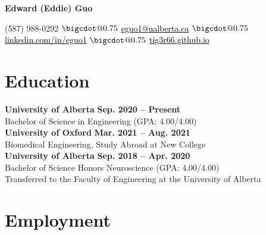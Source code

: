 \documentclass{article}
\makeatletter
\newcommand*\bigcdot{\mathpalette\bigcdot@{0.75}}
\newcommand*\bigcdot@[2]{\mathbin{\vcenter{\hbox{\scalebox{#2}{$\m@th#1\bullet$}}}}}
\makeatother
\begin{document}
\thispagestyle{plain}
\LARGE \textbf{\textcolor{my_colour}{Edward (Eddie) Guo}} \vspace{.25em}

\normalfont \normalsize
(587) 988-0292
    \hspace{.25em} $\bigcdot$ \hspace{.25em}
\href{mailto:eguo1@ualberta.ca}{\textcolor{black}{eguo1@ualberta.ca}}
    \hspace{.25em} $\bigcdot$ \hspace{.25em}
\href{https://www.linkedin.com/in/eguo1}{\textcolor{black}{linkedin.com/in/eguo1}}
    \hspace{.25em} $\bigcdot$ \hspace{.25em}
\href{https://tig3r66.github.io/index.html}{\textcolor{black}{tig3r66.github.io}}
\vspace{-.25em}


\section*{\textcolor{my_colour}{Education}}
\vspace{-.25em} \hrulefill \vspace{.75em}

\textbf{University of Alberta} \hfill \textbf{Sep. 2020 -- Present}\\
Bachelor of Science in Engineering (GPA: 4.00/4.00)\\

\textbf{University of Oxford} \hfill \textbf{Mar. 2021 -- Aug. 2021}\\
Biomedical Engineering, Study Abroad at New College \\

\textbf{University of Alberta} \hfill \textbf{Sep. 2018 -- Apr. 2020}\\
Bachelor of Science Honors Neuroscience (GPA: 4.00/4.00)\\
Transferred to the Faculty of Engineering at the University of Alberta


\section*{\textcolor{my_colour}{Employment}}
\vspace{-.25em} \hrulefill \vspace{.75em}
\end{document}
